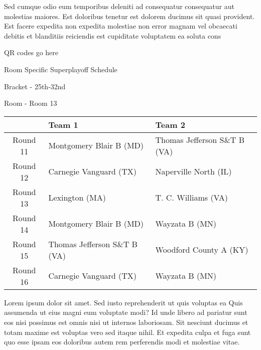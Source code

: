 \documentclass{article}%
\begin{document}
\newline%
    Sed cumque odio eum temporibus deleniti ad consequatur consequatur aut molestias maiores. Est doloribus tenetur est dolorem ducimus sit quasi provident. Est facere expedita non expedita molestiae non error magnam vel obcaecati debitis et blanditiis reiciendis est cupiditate voluptatem ea soluta cons%
\vspace*{140pt}%
\begin{center}%
\begin{Huge}%
QR codes go here%
\end{Huge}%
\end{center}%
\newpage%
\begin{center}%
\begin{Huge}%
Room Specific Superplayoff Schedule%
\end{Huge}%
\vspace*{8pt}%
\linebreak%
\begin{Large}%
Bracket {-} 25th{-}32nd%
\end{Large}%
\vspace*{8pt}%
\linebreak%
\vspace*{8pt}%
\begin{Large}%
Room {-} Room 13%
\end{Large}%
\end{center}%
%
\begin{tabularx}{\textwidth}{|c|Y|Y|}%
\hline%
&Team 1&Team 2\\%
\hline%
Round 11&Montgomery Blair B (MD)&Thomas Jefferson S\&T B (VA)\\%
Round 12&Carnegie Vanguard (TX)&Naperville North (IL)\\%
Round 13&Lexington (MA)&T. C. Williams (VA)\\%
Round 14&Montgomery Blair B (MD)&Wayzata B (MN)\\%
Round 15&Thomas Jefferson S\&T B (VA)&Woodford County A (KY)\\%
Round 16&Carnegie Vanguard (TX)&Wayzata B (MN)\\%
\hline%
\end{tabularx}%
\vspace*{8pt}%
\newline%
    Lorem ipsum dolor sit amet. Sed iusto reprehenderit ut quis voluptas ea Quis assumenda ut eius magni eum voluptate modi? Id unde libero ad pariatur sunt eos nisi possimus est omnis nisi ut internos laboriosam. Sit nesciunt ducimus et totam maxime est voluptas vero sed itaque nihil. Et expedita culpa et fuga sunt quo esse ipsam eos doloribus autem rem perferendis modi et molestiae vitae.\newline%
\end{document}
